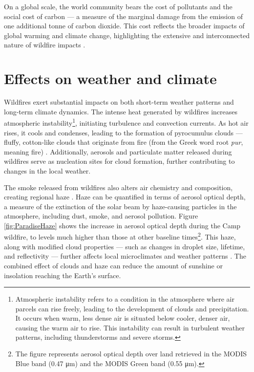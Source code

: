 \documentclass[
  12 pt,
]{Nemilov}
\begin{document}
On a global scale, the world community bears the cost of pollutants and the social cost of carbon --- a measure of the marginal damage from the emission of one additional tonne of carbon dioxide. This cost reflects the broader impacts of global warming and climate change, highlighting the extensive and interconnected nature of wildfire impacts \citep{sweeney2023estimating}.

\section{Effects on weather and climate}\label{effects-on-weather-and-climate}

Wildfires exert substantial impacts on both short-term weather patterns and long-term climate dynamics. The intense heat generated by wildfires increases atmospheric instability\footnote{Atmospheric instability refers to a condition in the atmosphere where air parcels can rise freely, leading to the development of clouds and precipitation. It occurs when warm, less dense air is situated below cooler, denser air, causing the warm air to rise. This instability can result in turbulent weather patterns, including thunderstorms and severe storms.}, initiating turbulence and convection currents. As hot air rises, it cools and condenses, leading to the formation of pyrocumulus clouds --- fluffy, cotton-like clouds that originate from fire (from the Greek word root \emph{pur}, meaning fire) \citep{lareau2016environmental}. Additionally, aerosols and particulate matter released during wildfires serve as nucleation sites for cloud formation, further contributing to changes in the local weather.

The smoke released from wildfires also alters air chemistry and composition, creating regional haze \citep{budisulistiorini2018dominant}. Haze can be quantified in terms of aerosol optical depth, a measure of the extinction of the solar beam by haze-causing particles in the atmosphere, including dust, smoke, and aerosol pollution. Figure \ref{fig:ParadiseHaze} shows the increase in aerosol optical depth during the Camp wildfire, to levels much higher than those at other baseline times\footnote{The figure represents aerosol optical depth over land retrieved in the MODIS Blue band (0.47 μm) and the MODIS Green band (0.55 μm).}. This haze, along with modified cloud properties --- such as changes in droplet size, lifetime, and reflectivity --- further affects local microclimates and weather patterns \citep{duff2014effects}. The combined effect of clouds and haze can reduce the amount of sunshine or insolation reaching the Earth's surface.
\end{document}
